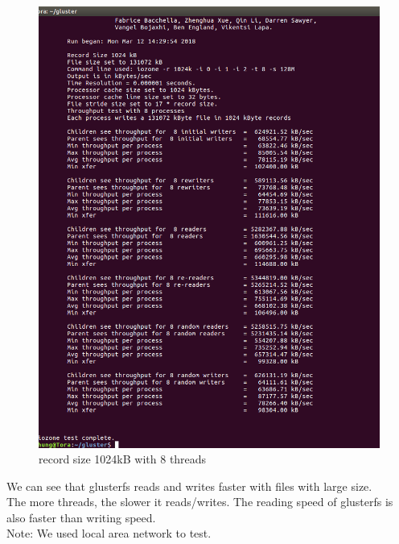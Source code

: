 \documentclass[12pt]{article}
\begin{document}
     \begin{figure}[H]
        \centering
       \includegraphics[scale=0.4]{1024kB 8 proccesses.png}
       \caption{record size 1024kB with 8 threads}
    \end{figure}
        We can see that glusterfs reads and writes faster with files with large size.\\
        The more threads, the slower it reads/writes. The reading speed of glusterfs is also faster than writing speed.
        \\ Note: We used local area network to test.
        
\end{document}
